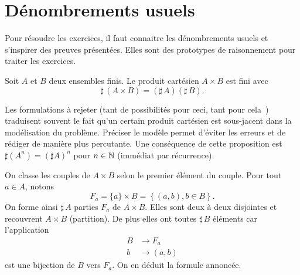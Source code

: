 \section{Dénombrements usuels}
Pour résoudre les exercices, il faut connaitre les dénombrements usuels et s'inspirer des preuves présentées. Elles sont des prototypes de raisonnement pour traiter les exercices.

\begin{propn}
 Soit $A$ et $B$ deux ensembles finis. Le produit cartésien $A\times B$ est fini avec
\begin{displaymath}
 \sharp\,(A\times B) = (\sharp\, A)(\sharp\, B).
\end{displaymath}
\end{propn}
\begin{rems}
 Les formulations à rejeter (\og tant de possibilités pour ceci, tant pour cela\fg~) traduisent souvent le fait qu'un certain produit cartésien est sous-jacent dans la modélisation du problème. Préciser le modèle permet d'éviter les erreurs et de rédiger de manière plus percutante. \newline
 Une conséquence de cette proposition est $\sharp(A^n) = (\sharp A)^n$ pour $n\in \mathbb{N}$ (immédiat par récurrence).
\end{rems}

\begin{demo}
 On classe les couples de $A \times B$ selon le premier élément du couple. Pour tout $a\in A$, notons
\begin{displaymath}
 F_a = \{a\}\times B = \left\lbrace (a,b) , b\in B\right\rbrace .
\end{displaymath}
On forme ainsi $\sharp\,A$ parties $F_a$ de $A\times B$. Elles sont deux à deux disjointes et recouvrent $A\times B$ (partition). De plus elles ont toutes $\sharp\,B$ éléments car l'application
\begin{displaymath}
 \begin{aligned}
  B &\rightarrow F_a\\
  b &\rightarrow (a,b)
 \end{aligned}
\end{displaymath}
est une bijection de $B$ vers $F_a$. On en déduit la formule annoncée.
\end{demo}

